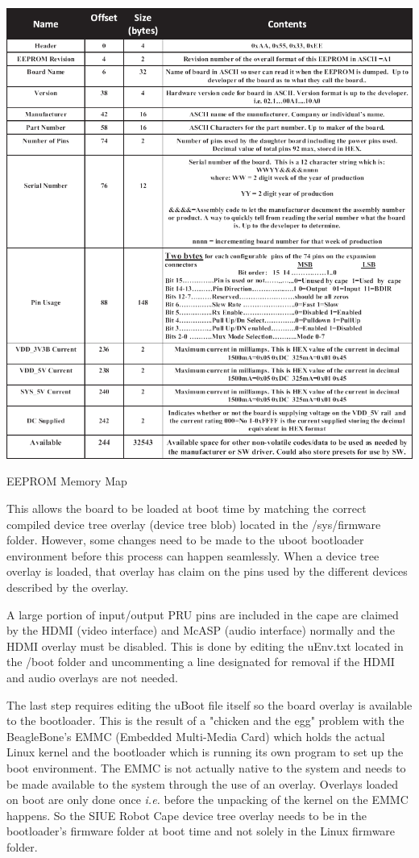 \documentclass[12pt,oneside,final]{siuethesis}
\theoremstyle{definition}
\begin{document}
\begin{table}[htbp!]
 \centering
 \includegraphics[scale=.75,keepaspectratio=true]{./images/eeprom_setup.png}
 \caption{EEPROM Memory Map}
 \label{tab:EEPROM setup}
\end{table}

This allows the board to be loaded at boot time by matching the correct compiled device tree overlay (device tree blob) located in the /sys/firmware folder. However, some changes need to be made to the uboot bootloader environment before this process can happen seamlessly. When a device tree overlay is loaded, that overlay has claim on the pins used by the different devices described by the overlay. 

A large portion of input/output PRU pins are included in the cape are claimed by the HDMI (video interface) and McASP (audio interface) normally and the HDMI overlay must be disabled. This is done by editing the uEnv.txt located in the /boot folder and uncommenting a line designated for removal if the HDMI and audio overlays are not needed. 

The last step requires editing the uBoot file itself so the board overlay is available to the bootloader. This is the result of a "chicken and the egg" problem with the BeagleBone’s EMMC (Embedded Multi-Media Card) which holds the actual Linux kernel and the bootloader which is running its own program to set up the boot environment. The EMMC is not actually native to the system and needs to be made available to the system through the use of an overlay. Overlays loaded on boot are only done once \emph{i.e.} before the unpacking of the kernel on the EMMC happens. So the SIUE Robot Cape device tree overlay needs to be in the bootloader’s firmware folder at boot time and not solely in the Linux firmware folder. 
\end{document}
